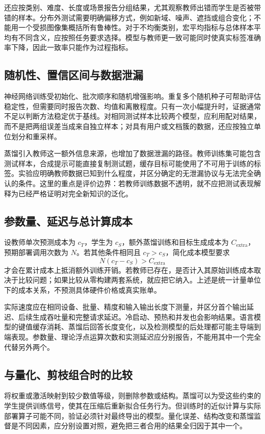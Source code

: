 \documentclass[UTF8,12pt,a4paper,fontset=fandol]{ctexart}
\begin{document}
还应按类别、难度、长度或场景报告分组结果，尤其观察教师出错而学生是否被带错的样本。分布外测试需要明确偏移方式，例如新域、噪声、遮挡或组合变化；不能用一个受损图像集概括所有鲁棒性。对于不均衡类别，宏平均指标与总体样本平均有不同含义，应按照任务要求选择。模型与教师更一致可能同时使真实标签准确率下降，因此一致率只能作为过程指标。

\subsection{随机性、置信区间与数据泄漏}
神经网络训练受初始化、批次顺序和随机增强影响。重复多个随机种子可帮助评估稳定性，但需要同时报告次数、均值和离散程度。只有一次小幅提升时，证据通常不足以判断方法稳定优于基线。对相同测试样本比较两个模型，应利用配对结果，而不是把两组误差当成来自独立样本；对具有用户或文档簇的数据，还应按独立单位划分和重采样。

蒸馏引入教师这一额外信息来源，也增加了数据泄漏的路径。教师训练集可能包含测试样本，合成提示可能直接复制测试题，缓存目标可能使用了不可用于训练的标签。实验应明确教师数据已知到什么程度，并区分确定的无泄漏协议与无法完全确认的条件。这里的重点是评价边界：若教师训练数据不透明，就不应把测试表现解释为已经严格证明对完全新知识的泛化。

\subsection{参数量、延迟与总计算成本}
设教师单次预测成本为 $c_T$，学生为 $c_S$，额外蒸馏训练和目标生成成本为 $C_{\mathrm{extra}}$，预期部署调用次数为 $N$。若其他条件相同且 $c_T>c_S$，简化成本模型要求
\begin{equation}
 N(c_T-c_S)>C_{\mathrm{extra}}
 \label{eq:kd-amortization}
\end{equation}
才会在累计成本上抵消额外训练开销。若教师已存在，是否计入其原始训练成本取决于比较问题；如果比较从零构建两套系统，就应把它纳入。上述是统一计量单位下的成本关系，不预测具体硬件价格或真实账单。

实际速度应在相同设备、批量、精度和输入输出长度下测量，并区分首个输出延迟、后续生成吞吐量和完整请求延迟。冷启动、预热和并发也会影响结果。语言模型的键值缓存消耗、蒸馏后回答长度变化，以及检测模型的后处理都可能主导端到端表现。参数量、理论浮点运算次数和实测延迟应分别报告，不能用其中一个完全代替另外两个。

\subsection{与量化、剪枝组合时的比较}
将权重或激活映射到较少数值等级，则删除参数或结构。蒸馏可以为受这些约束的学生提供训练信号，使其在压缩后重新拟合任务行为。但训练时的近似计算与实际部署算子可能不同，验证必须针对最终导出的模型。量化误差、结构改变和蒸馏监督是不同因素，应分别设置对照，避免把三者合用的结果全归因于其中一个。
\end{document}
